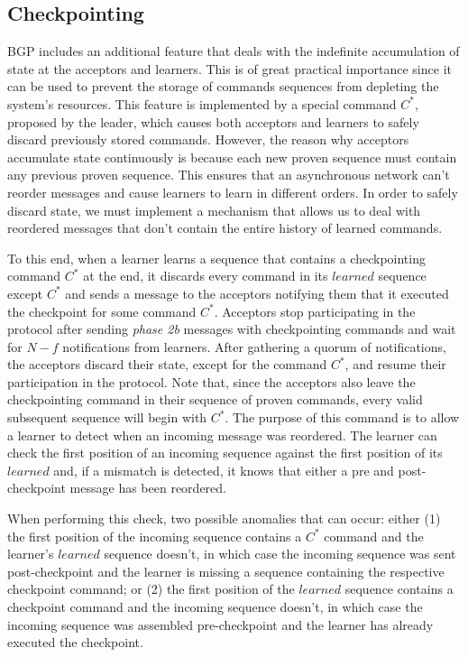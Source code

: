 \subsection{Checkpointing}  BGP includes an additional feature that deals with the indefinite accumulation of state at the acceptors and learners. This is of great practical importance since it can be used to prevent the storage of commands sequences from depleting the system's resources. This feature is implemented by a special command $C^*$, proposed by the leader, which causes both acceptors and learners to safely discard previously stored commands. However, the reason why acceptors accumulate state continuously is because each new proven sequence must contain any previous proven sequence. This ensures that an asynchronous network can't reorder messages and cause learners to learn in different orders. In order to safely discard state, we must implement a mechanism that allows us to deal with reordered messages that don't contain the entire history of learned commands.\par
To this end, when a learner learns a sequence that contains a checkpointing command $C^*$ at the end, it discards every command in its $learned$ sequence except $C^*$ and sends a message to the acceptors notifying them that it executed the checkpoint for some command $C^*$. Acceptors stop participating in the protocol after sending \textit{phase 2b} messages with checkpointing commands and wait for $N-f$ notifications from learners. After gathering a quorum of notifications, the acceptors discard their state, except for the command $C^*$, and resume their participation in the protocol. Note that, since the acceptors also leave the checkpointing command in their sequence of proven commands, every valid subsequent sequence will begin with $C^*$. The purpose of this command is to allow a learner to detect when an incoming message was reordered. The learner can check the first position of an incoming sequence against the first position of its $learned$ and, if a mismatch is detected, it knows that either a pre and post-checkpoint message has been reordered. \par
When performing this check, two possible anomalies that can occur: either (1) the first position of the incoming sequence contains a $C^*$ command and the learner's $learned$ sequence doesn't, in which case the incoming sequence was sent post-checkpoint and the learner is missing a sequence containing the respective checkpoint command; or (2) the first position of the $learned$ sequence contains a checkpoint command and the incoming sequence doesn't, in which case the incoming sequence was assembled pre-checkpoint and the learner has already executed the checkpoint. \par
